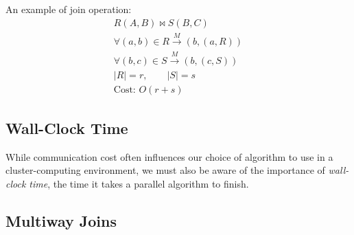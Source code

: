 An example of join operation:
\begin{equation*}
    \begin{split}
        R(A,B) \bowtie S(B,C) \\
        \forall (a,b) \in R \xrightarrow{M} (b, (a,R)) \\
        \forall (b,c) \in S \xrightarrow{M} (b, (c,S)) \\
        |R|=r, \qquad |S|=s \\
        \text{Cost: } O(r+s)
    \end{split}
\end{equation*}

\subsection{Wall-Clock Time}\label{subsec:wall-clock-time}

While communication cost often influences our choice of algorithm to use in a cluster-computing environment, we must also be aware of the importance of \textit{wall-clock time}, the time it takes a parallel algorithm to finish.

\subsection{Multiway Joins}\label{subsec:multiway-joins}

